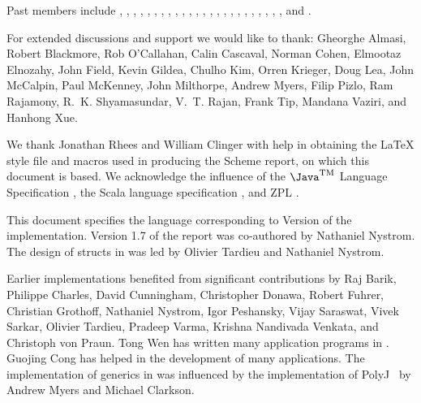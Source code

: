 Past members include
, 
, 
, 
, 
, 
, 
, 
, 
,
,
, 
, 
, 
, 
,
,
,  
, 
, 
,
,
, 
,
, and
.

For extended discussions and support we would like to thank: 
Gheorghe Almasi,
Robert Blackmore,
Rob O'Callahan, 
Calin Cascaval, 
Norman Cohen, 
Elmootaz Elnozahy, 
John Field,
Kevin Gildea,
Chulho Kim,
Orren Krieger, 
Doug Lea, 
John McCalpin, 
Paul McKenney, 
John Milthorpe,
Andrew Myers,
Filip Pizlo, 
Ram Rajamony,
R.~K. Shyamasundar, 
V.~T. Rajan, 
Frank Tip,
Mandana Vaziri,
and
Hanhong Xue.


We thank Jonathan Rhees and William Clinger with help in obtaining the
\LaTeX{} style file and macros used in producing the Scheme report,
on which this document is based. We acknowledge the influence of
the $\mbox{\Java}^{\mbox{\textsc{tm}}}$ Language
Specification \cite{jls2}, the Scala language specification
\cite{scala-spec}, and ZPL \cite{zpl}.

This document specifies the language corresponding to Version
\integerversion{}
of the implementation. Version 1.7 of the report was co-authored by
Nathaniel Nystrom. The design of structs in \Xten{} was led by Olivier Tardieu
and Nathaniel Nystrom.

Earlier implementations benefited from significant contributions by
Raj Barik, 
Philippe Charles, 
David Cunningham,
Christopher Donawa, 
Robert Fuhrer,
Christian Grothoff,
Nathaniel Nystrom,  
Igor Peshansky,  
Vijay Saraswat,
Vivek Sarkar, 
Olivier Tardieu,  
Pradeep Varma, 
Krishna Nandivada Venkata, and
Christoph von Praun.
Tong Wen has written many application programs
in \Xten{}. Guojing Cong has helped in the
development of many applications.
The implementation of generics in \Xten{} was influenced by the
implementation of PolyJ~\cite{polyj} by Andrew Myers and Michael Clarkson.
